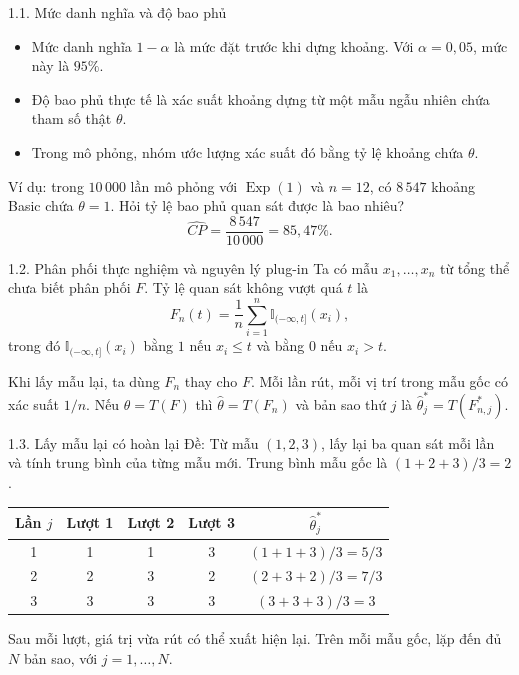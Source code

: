 \documentclass[aspectratio=43,10pt]{beamer}
\newcommand{\slidesource}{}
\begin{document}
\renewcommand{\slidesource}{Nguồn: Báo cáo nhóm D, Lời mở đầu, tr. 3; Bảng 6.1, tr. 13; Bài giảng Ch. 4, tr. 55}
\begin{frame}{1.1. Mức danh nghĩa và độ bao phủ}
    \begin{itemize}
        \item Mức danh nghĩa $1-\alpha$ là mức đặt trước khi dựng khoảng. Với $\alpha=0{,}05$, mức này là $95\%$.
        \item Độ bao phủ thực tế là xác suất khoảng dựng từ một mẫu ngẫu nhiên chứa tham số thật $\theta$.
        \item Trong mô phỏng, nhóm ước lượng xác suất đó bằng tỷ lệ khoảng chứa $\theta$.
    \end{itemize}
    \medskip
    Ví dụ: trong $10\,000$ lần mô phỏng với $\operatorname{Exp}(1)$ và $n=12$, có $8\,547$ khoảng Basic chứa $\theta=1$. Hỏi tỷ lệ bao phủ quan sát được là bao nhiêu?
    \[
    \widehat{CP}=\frac{8\,547}{10\,000}=85{,}47\%.
    \]
\end{frame}

\renewcommand{\slidesource}{Nguồn: Báo cáo nhóm D, tr. 2--5}
\begin{frame}{1.2. Phân phối thực nghiệm và nguyên lý plug-in}
    Ta có mẫu $x_1,\ldots,x_n$ từ tổng thể chưa biết phân phối $F$. Tỷ lệ quan sát không vượt quá $t$ là
    \[
    F_n(t)=\frac1n\sum_{i=1}^n \mathbb{I}_{(-\infty,t]}(x_i),
    \]
    trong đó $\mathbb{I}_{(-\infty,t]}(x_i)$ bằng $1$ nếu $x_i\le t$ và bằng $0$ nếu $x_i>t$.
    \medskip

    Khi lấy mẫu lại, ta dùng $F_n$ thay cho $F$. Mỗi lần rút, mỗi vị trí trong mẫu gốc có xác suất $1/n$.
    Nếu $\theta=T(F)$ thì $\hat\theta=T(F_n)$ và bản sao thứ $j$ là $\hat\theta_j^*=T(F_{n,j}^*)$.
\end{frame}

\renewcommand{\slidesource}{Nguồn: Báo cáo nhóm D, tr. 5, 9 và 11}
\begin{frame}{1.3. Lấy mẫu lại có hoàn lại}
    Đề: Từ mẫu $(1,2,3)$, lấy lại ba quan sát mỗi lần và tính trung bình của từng mẫu mới. Trung bình mẫu gốc là $(1+2+3)/3=2$.
    \medskip

    \centering
    \begin{tabular}{ccccc}
    \toprule
    Lần $j$ & Lượt 1 & Lượt 2 & Lượt 3 & $\hat\theta_j^*$\\
    \midrule
    1 & 1 & 1 & 3 & $(1+1+3)/3=5/3$\\
    2 & 2 & 3 & 2 & $(2+3+2)/3=7/3$\\
    3 & 3 & 3 & 3 & $(3+3+3)/3=3$\\
    \bottomrule
    \end{tabular}\par
    \medskip
    \raggedright
    Sau mỗi lượt, giá trị vừa rút có thể xuất hiện lại. Trên mỗi mẫu gốc, lặp đến đủ $N$ bản sao, với $j=1,\ldots,N$.
\end{frame}
\end{document}
